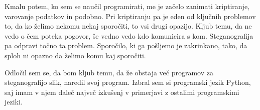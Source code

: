 Kmalu potem, ko sem se naučil programirati, me je začelo zanimati kriptiranje, varovanje podatkov in podobno. Pri kriptiranju pa je eden od ključnih problemov to, da ko želimo nekomu nekaj sporočiti, to vsi drugi opazijo. Kljub temu, da ne vedo o čem poteka pogovor, še vedno vedo kdo komunicira s kom. Steganografija pa odpravi točno ta problem. Sporočilo, ki ga pošljemo je zakrinkano, tako, da sploh ni opazno da želimo komu kaj sporočiti. \cite{wikipedia}

Odločil sem se, da bom kljub temu, da že obstaja več programov za steganografijo slik, naredil svoj program. Izbral sem si programski jezik Python, saj imam v njem daleč največ izkušenj v primerjavi z ostalimi programskimi jeziki.
